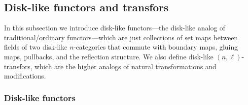 \documentclass[12pt,reqno]{amsart}
\begin{document}
\subsection{Disk-like functors and transfors}
In this subsection we introduce disk-like functors---the disk-like analog of traditional/ordinary functors---which are just collections of set maps between fields of two disk-like $n$-categories that commute with boundary maps, gluing maps, pullbacks, and the reflection structure. We also define disk-like $(n,\ell)$-transfors, which are the higher analogs of natural transformations and modifications. 

\subsubsection{Disk-like functors}

\
\end{document}
